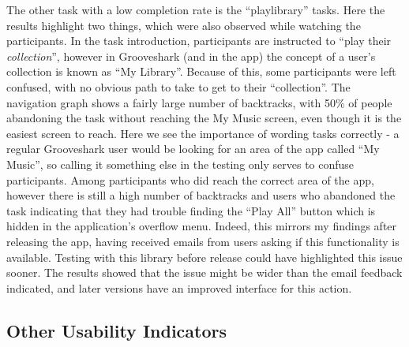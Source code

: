 The other task with a low completion rate is the ``playlibrary'' tasks. Here the results
highlight two things, which were also observed while watching the participants.
In the task introduction, participants are instructed to ``play their \emph{collection}'',
however in Grooveshark (and in the app) the concept of a user's collection is known as 
``My Library''. Because of this, some participants were left confused, with no obvious path
to take to get to their ``collection''. The navigation graph shows a fairly large number of
backtracks, with 50\% 
of people abandoning the task without reaching the My Music screen,
even though it is the easiest screen to reach. Here we see the importance of wording 
tasks correctly - a regular
Grooveshark user would be looking for an area of the app called ``My Music'', so
calling it something else in the testing only serves to confuse participants.
Among participants who did reach the correct area of the app, however there is still
a high number of backtracks and users who abandoned the task indicating that they had trouble
finding the ``Play All'' button which is hidden in the application's overflow menu. Indeed, this mirrors
my findings after releasing the app, having received emails from users asking if this functionality
is available. Testing with this library before release could have highlighted this issue sooner.
The results showed that the issue might be wider than the email feedback indicated, and later
versions have an improved interface for this action.

\subsection{Other Usability Indicators}

